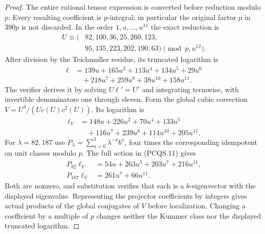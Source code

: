 \begin{proof}
The entire rational tensor expression is converted before
reduction modulo $p$.  Every resulting coefficient is $p$-integral;
in particular the original factor $p$ in $390p$ is not discarded.
In the order $1,u,\ldots,u^{11}$ the exact reduction is
\[
 \begin{aligned}
 U\equiv(&82,100,36,25,260,123,\\
         &95,135,223,202,190,63)\pmod{p,u^{12}}.
 \end{aligned}
 \tag{PCQS.14}
\]
After division by the Teichmuller residue, its truncated logarithm is
\[
 \begin{aligned}
 \ell&=139u+165u^2+113u^4+134u^5+29u^6\\
     &\quad+218u^7+259u^8+38u^{10}+158u^{11}.
 \end{aligned}
 \tag{PCQS.15}
\]
The verifier derives it by solving $U\ell'=U'$ and integrating
termwise, with invertible denominators one through eleven.
Form the global cubic correction
$V=U^3/(Uc(U)c^2(U))$.
Its logarithm is
\[
 \begin{aligned}
 \ell_V&=148u+226u^2+70u^4+133u^5\\
       &\quad+116u^7+239u^8+114u^{10}+205u^{11}.
 \end{aligned}
 \tag{PCQS.16}
\]
For $\lambda=82,187$ use
$P_\lambda=\sum_{a=0}^3\lambda^{-a}b^a$, four times the
corresponding idempotent on unit classes modulo $p$.
The full action in (PCQS.11) gives
\[
 \begin{aligned}
 P_{82}\ell_V&=54u+263u^5+203u^7+216u^{11},\\
 P_{187}\ell_V&=261u^7+66u^{11}.
 \end{aligned}
 \tag{PCQS.17}
\]
Both are nonzero, and substitution verifies that each is a
$b$-eigenvector with the displayed eigenvalue.
Representing the projector coefficients by integers gives actual
products of the global conjugates of $V$ before localization.
Changing a coefficient by a multiple of $p$ changes neither
the Kummer class nor the displayed truncated logarithm.


\end{proof}
